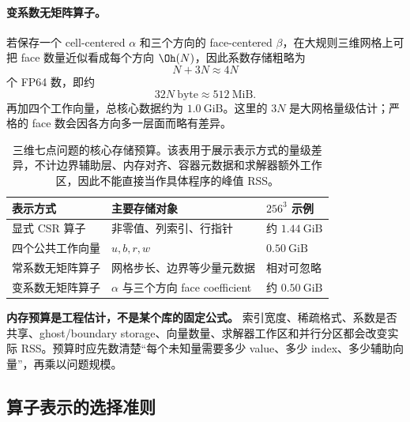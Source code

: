 \paragraph{变系数无矩阵算子。}
若保存一个 cell-centered $\alpha$ 和三个方向的 face-centered $\beta$，在大规则三维网格上可把 face 数量近似看成每个方向 $\Oh(N)$，因此系数存储粗略为
\begin{equation}
N+3N\approx4N
\end{equation}
个 FP64 数，即约
\begin{equation}
32N\ \text{byte}\approx512\ \mathrm{MiB}.
\end{equation}
再加四个工作向量，总核心数据约为 $1.0\ \mathrm{GiB}$。这里的 $3N$ 是大网格量级估计；严格的 face 数会因各方向多一层面而略有差异。

\begin{table}[htbp]
\centering
\small
\begin{tabularx}{0.94\textwidth}{>{\raggedright\arraybackslash}p{3.7cm}
                                  >{\raggedright\arraybackslash}X
                                  >{\raggedleft\arraybackslash}p{2.4cm}}
\toprule
表示方式 & 主要存储对象 & $256^3$ 示例\\
\midrule
显式 CSR 算子 & 非零值、列索引、行指针 & 约 $1.44\ \mathrm{GiB}$\\
四个公共工作向量 & $u,b,r,w$ & $0.50\ \mathrm{GiB}$\\
常系数无矩阵算子 & 网格步长、边界等少量元数据 & 相对可忽略\\
变系数无矩阵算子 & $\alpha$ 与三个方向 face coefficient & 约 $0.50\ \mathrm{GiB}$\\
\bottomrule
\end{tabularx}
\caption{三维七点问题的核心存储预算。该表用于展示表示方式的量级差异，不计边界辅助层、内存对齐、容器元数据和求解器额外工作区，因此不能直接当作具体程序的峰值 RSS。}
\label{tab:discretization-storage-budget}
\end{table}

\begin{warningbox}
\textbf{内存预算是工程估计，不是某个库的固定公式。}
索引宽度、稀疏格式、系数是否共享、ghost/boundary storage、向量数量、求解器工作区和并行分区都会改变实际 RSS。预算时应先数清楚“每个未知量需要多少 value、多少 index、多少辅助向量”，再乘以问题规模。
\end{warningbox}

\subsection{算子表示的选择准则}

